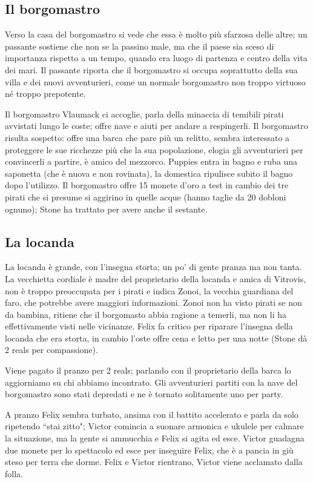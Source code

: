 \documentclass[letterpaper,twocolumn,openany,justified,nodeprecatedcode]{dndbook}
\begin{document}
\subsection{Il borgomastro}
Verso la casa del borgomastro si vede che essa è molto più sfarzosa delle altre; un passante sostiene che non se la passino male, ma che il paese sia sceso di importanza rispetto a un tempo, quando era luogo di partenza e centro della vita dei mari. Il passante riporta che il borgomastro si occupa soprattutto della sua villa e dei nuovi avventurieri, come un normale borgomastro non troppo virtuoso né troppo prepotente.

Il borgomastro Vlaumack ci accoglie, parla della minaccia di temibili pirati avvistati lungo le coste; offre nave e aiuti per andare a respingerli. Il borgomastro risulta sospetto: offre una barca che pare più un relitto, sembra interessato a proteggere le sue ricchezze più che la sua popolazione, elogia gli avventurieri per convincerli a partire, è amico del mezzorco.
Puppies entra in bagno e ruba una saponetta (che è nuova e non rovinata), la domestica ripulisce subito il bagno dopo l'utilizzo.
Il borgomastro offre 15 monete d'oro a test in cambio dei tre pirati che si presume si aggirino in quelle acque (hanno taglie da 20 dobloni ognuno); Stone ha trattato per avere anche il sestante.

\subsection{La locanda}
La locanda è grande, con l'insegna storta; un po' di gente pranza ma non tanta. La vecchietta cordiale è madre del proprietario della locanda e amica di Vitrovis, non è troppo preoccupata per i pirati e indica Zonoi, la vecchia guardiana del faro, che potrebbe avere maggiori informazioni. Zonoi non ha visto pirati se non da bambina, ritiene che il borgomasto abbia ragione a temerli, ma non li ha effettivamente visti nelle vicinanze. Felix fa critico per riparare l'insegna della locanda che era storta, in cambio l'oste offre cena e letto per una notte (Stone dà 2 reals per compassione).

Viene pagato il pranzo per 2 reals; parlando con il proprietario della barca lo aggiorniamo su chi abbiamo incontrato. Gli avventurieri partiti con la nave del borgomastro sono stati depredati e ne è tornato solitamente uno per party.

A pranzo Felix sembra turbato, ansima con il battito accelerato e parla da solo ripetendo ``stai zitto"; Victor comincia a suonare armonica e ukulele per calmare la situazione, ma la gente si ammucchia e Felix si agita ed esce. Victor guadagna due monete per lo spettacolo ed esce per inseguire Felix, che è a pancia in giù steso per terra che dorme. Felix e Victor rientrano, Victor viene acclamato dalla folla.
\end{document}
